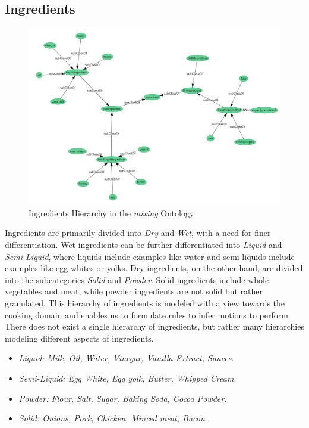 \subsection{Ingredients}

\begin{figure}[H]
    \includegraphics[scale=0.45]{Graphics/classHierarchy/ingredients_hierarchy.png}
    \centering
    \caption{Ingredients Hierarchy in the \textit{mixing} Ontology}
\end{figure}

Ingredients are primarily divided into \textit{Dry} and \textit{Wet}, with a need for finer differentiation.
Wet ingredients can be further differentiated into \textit{Liquid} and \textit{Semi-Liquid}, where liquids include examples like water and semi-liquids include examples like egg whites or yolks. 
Dry ingredients, on the other hand, are divided into the subcategories \textit{Solid} and \textit{Powder}. 
Solid ingredients include whole vegetables and meat, while powder ingredients are not solid but rather granulated. 
This hierarchy of ingredients is modeled with a view towards the cooking domain and enables us to formulate rules to infer motions to perform. 
There does not exist a single hierarchy of ingredients, but rather many hierarchies modeling different aspects of ingredients.

\begin{itemize}
    \item \textit{Liquid: Milk, Oil, Water, Vinegar, Vanilla Extract, Sauces}.
    \item \textit{Semi-Liquid: Egg White, Egg yolk, Butter, Whipped Cream}.
    \item \textit{Powder: Flour, Salt, Sugar, Baking Soda, Cocoa Powder}.
    \item \textit{Solid: Onions, Pork, Chicken, Minced meat, Bacon}.
  \end{itemize}

